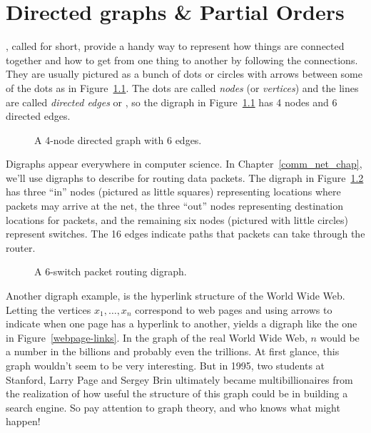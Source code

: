 \chapter{Directed graphs \& Partial Orders}\label{digraphs_chap}


, called  for short, provide a
handy way to represent how things are connected together and how to
get from one thing to another by following the connections.  They are
usually pictured as a bunch of dots or circles with arrows between
some of the dots as in Figure~\ref{fig:4N6E}.  The dots are called
\emph{nodes} (or \emph{vertices}) and the lines are called
\emph{directed edges} or , so the digraph in
Figure~\ref{fig:4N6E} has 4 nodes and 6 directed edges.

\begin{figure}


\caption{A 4-node directed graph with 6 edges.}

\label{fig:4N6E}

\end{figure}

Digraphs appear everywhere in computer science.  In
Chapter~\ref{comm_net_chap}, we'll use digraphs to describe
 for routing data packets.  The digraph in
Figure~\ref{fig:6switchnet} has three ``in'' nodes (pictured as little
squares) representing locations where packets may arrive at the net,
the three ``out'' nodes representing destination locations for
packets, and the remaining six nodes (pictured with little circles)
represent switches.  The 16 edges indicate paths that packets can take
through the router.

\begin{figure}


\caption{A 6-switch packet routing digraph.}

\label{fig:6switchnet}
\end{figure}

Another digraph example, is the hyperlink structure of the World Wide
Web.  Letting the vertices $x_1, \ldots, x_n$ correspond to web pages
and using arrows to indicate when one page has a hyperlink to another,
yields a digraph like the one in Figure~\ref{webpage-links}.  In the
graph of the real World Wide Web, $n$ would be a number in the
billions and probably even the trillions.  At first glance, this graph
wouldn't seem to be very interesting.  But in 1995, two students at
Stanford,  Larry Page and 
Sergey Brin ultimately became multibillionaires from the realization
of how useful the structure of this graph could be in building a
search engine.  So pay attention to graph theory, and who knows what
might happen!

